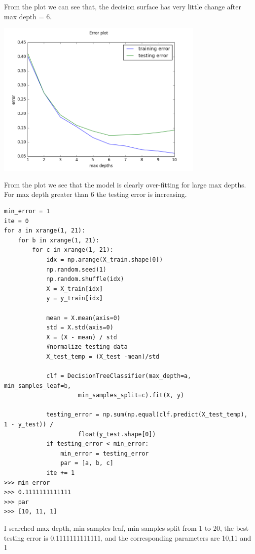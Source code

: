 \documentclass{article}
\newenvironment{sub}[2][$-$]{\begin{trivlist}
		\item[\hskip \labelsep {\bfseries #1}\hskip \labelsep {\bfseries #2.}]}  {\end{trivlist}}
\begin{document}
From the plot we can see that, the decision surface has very little change after max depth = 6.


\begin{sub}{2.1.3}
\end{sub}

\begin{center}
\includegraphics[width = 4in]{2_1_3}
\end{center}

From the plot we see that the model is clearly over-fitting for large max depths. For max depth greater than 6 the testing error is increasing.  

\begin{sub}{2.1.4}
\end{sub}

\begin{verbatim}
min_error = 1
ite = 0
for a in xrange(1, 21):
    for b in xrange(1, 21):
        for c in xrange(1, 21):
            idx = np.arange(X_train.shape[0])
            np.random.seed(1)
            np.random.shuffle(idx)
            X = X_train[idx]
            y = y_train[idx]

            mean = X.mean(axis=0)
            std = X.std(axis=0)
            X = (X - mean) / std
            #normalize testing data
            X_test_temp = (X_test -mean)/std

            clf = DecisionTreeClassifier(max_depth=a, min_samples_leaf=b,
            		 min_samples_split=c).fit(X, y)

            testing_error = np.sum(np.equal(clf.predict(X_test_temp), 1 - y_test)) /
            		 float(y_test.shape[0])
            if testing_error < min_error:
                min_error = testing_error
                par = [a, b, c]
            ite += 1
>>> min_error
>>> 0.1111111111111
>>> par
>>> [10, 11, 1]
\end{verbatim}
I searched max depth, min samples leaf, min samples split from 1 to 20, the best testing error is  0.1111111111111, and the corresponding parameters are 10,11 and 1
\end{document}
